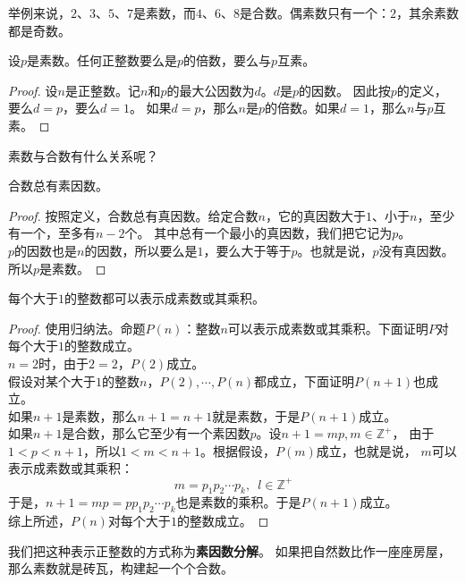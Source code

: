 \documentclass[12pt,UTF8]{ctexbook}
\begin{document}
举例来说，$2$、$3$、$5$、$7$是素数，而$4$、$6$、$8$是合数。偶素数只有一个：$2$，其余素数都是奇数。

\begin{tm}\label{tm:1-0-0}
    设$p$是素数。任何正整数要么是$p$的倍数，要么与$p$互素。
\end{tm}
\begin{proof}
    设$n$是正整数。记$n$和$p$的最大公因数为$d$。$d$是$p$的因数。
    因此按$p$的定义，要么$d = p$，要么$d = 1$。
    如果$d = p$，那么$n$是$p$的倍数。如果$d = 1$，那么$n$与$p$互素。
\end{proof}

素数与合数有什么关系呢？

\begin{tm}\label{tm:1-0-4}
    合数总有素因数。
\end{tm}
\begin{proof}
    按照定义，合数总有真因数。给定合数$n$，它的真因数大于$1$、小于$n$，至少有一个，至多有$n-2$个。
    其中总有一个最小的真因数，我们把它记为$p$。\\
    $p$的因数也是$n$的因数，所以要么是$1$，要么大于等于$p$。也就是说，$p$没有真因数。所以$p$是素数。
\end{proof}

\begin{tm}\label{tm:1-0-6}
    每个大于$1$的整数都可以表示成素数或其乘积。
\end{tm}
\begin{proof}
    使用归纳法。命题$P(n)$：整数$n$可以表示成素数或其乘积。下面证明$P$对每个大于$1$的整数成立。\\
    $n=2$时，由于$2 = 2$，$P(2)$成立。\\
    假设对某个大于$1$的整数$n$，$P(2), \cdots, P(n)$都成立，下面证明$P(n+1)$也成立。\\
    如果$n+1$是素数，那么$n+1 = n+1$就是素数，于是$P(n+1)$成立。\\
    如果$n+1$是合数，那么它至少有一个素因数$p$。设$n+1 = mp, m\in\mathbb{Z}^+$，
    由于$1<p<n+1$，所以$1< m < n+1$。根据假设，$P(m)$成立，也就是说，
    $m$可以表示成素数或其乘积：
    $$ m = p_1 p_2\cdots p_k, \,\,\, l\in\mathbb{Z}^+$$
    于是，$n+1 = mp = pp_1 p_2\cdots p_k$也是素数的乘积。于是$P(n+1)$成立。\\
    综上所述，$P(n)$对每个大于$1$的整数成立。
\end{proof}

我们把这种表示正整数的方式称为\textbf{素因数分解}。
如果把自然数比作一座座房屋，那么素数就是砖瓦，构建起一个个合数。
\end{document}
